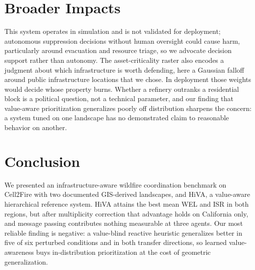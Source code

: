 \documentclass[letterpaper]{article}
\begin{document}
\section{Broader Impacts}
\label{sec:impacts}

This system operates in simulation and is not validated for deployment; autonomous suppression decisions without human oversight could cause harm, particularly around evacuation and resource triage, so we advocate decision support rather than autonomy. The asset-criticality raster also encodes a judgment about which infrastructure is worth defending, here a Gaussian falloff around public infrastructure locations that we chose. In deployment those weights would decide whose property burns. Whether a refinery outranks a residential block is a political question, not a technical parameter, and our finding that value-aware prioritization generalizes poorly off distribution sharpens the concern: a system tuned on one landscape has no demonstrated claim to reasonable behavior on another.

\section{Conclusion}
\label{sec:conclusion}

We presented an infrastructure-aware wildfire coordination benchmark on Cell2Fire with two documented GIS-derived landscapes, and HiVA, a value-aware hierarchical reference system. HiVA attains the best mean WEL and ISR in both regions, but after multiplicity correction that advantage holds on California only, and message passing contributes nothing measurable at three agents. Our most reliable finding is negative: a value-blind reactive heuristic generalizes better in five of six perturbed conditions and in both transfer directions, so learned value-awareness buys in-distribution prioritization at the cost of geometric generalization.


\end{document}
